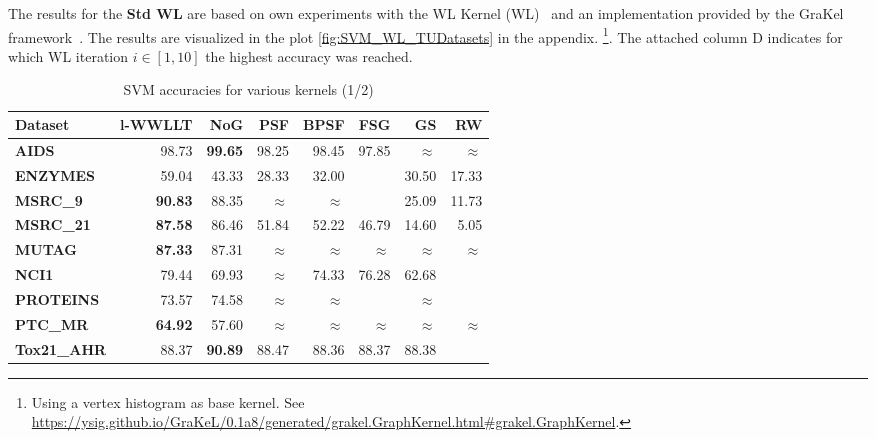     	The results for the \textbf{Std WL} are based on own experiments with the WL Kernel (WL)~\cite{2011_Shervashidze_JMLR} and an implementation provided by the GraKel framework~\cite{2020_Siglidis_CONF}.
    	The results are visualized in the plot \ref{fig:SVM_WL_TUDatasets} in the appendix.
    	\footnote{Using a vertex histogram as base kernel. See \url{https://ysig.github.io/GraKeL/0.1a8/generated/grakel.GraphKernel.html\#grakel.GraphKernel}.}.
    	The attached column D indicates for which WL iteration $i\in[1,10]$ the highest accuracy was reached.
    	    	
    	\begin{table}[h]
    		\centering
    		\begin{tabular}{|l||r|r|r|r|r|r|r|}
    			\hline
    			\textbf{Dataset} 	& \textbf{l-WWLLT} 	& \textbf{NoG} 		& \textbf{PSF} 			& \textbf{BPSF} & \textbf{FSG} & \textbf{GS} & \textbf{RW} \\ \hline\hline
    			\textbf{AIDS} 	 	& 98.73 		 	& \textbf{99.65} 	& 98.25 	& 98.45 	& 97.85 	& $\approx$	& $\approx$	\\ \hline
    			\textbf{ENZYMES} 	& 59.04 		 	& 43.33 			& 28.33 	& 32.00		& ~ 		& 30.50 	& 17.33 	\\ \hline
    			\textbf{MSRC\_9} 	& \textbf{90.83} 	& 88.35 			& $\approx$ & $\approx$ & ~ 		& 25.09 	& 11.73  	\\ \hline
    			\textbf{MSRC\_21}	& \textbf{87.58} 	& 86.46 			& 51.84 	& 52.22 	& 46.79 	& 14.60 	&  5.05  	\\ \hline    			
    			\textbf{MUTAG} 		& \textbf{87.33}	& 87.31 			& $\approx$ & $\approx$ & $\approx$ & $\approx$ & $\approx$ \\ \hline
    			\textbf{NCI1} 		& 79.44 			& 69.93 			& $\approx$ & 74.33 	& 76.28 	& 62.68 	& ~ 		\\ \hline
    			\textbf{PROTEINS} 	& 73.57 			& 74.58 			& $\approx$ & $\approx$ & ~ 		& $\approx$ & ~ 		\\ \hline
    			\textbf{PTC\_MR} 	& \textbf{64.92} 	& 57.60 			& $\approx$ & $\approx$	& $\approx$ & $\approx$ & $\approx$ \\ \hline
    			\textbf{Tox21\_AHR} & 88.37 			& \textbf{90.89} 	& 88.47 	& 88.36 	& 88.37 	& 88.38 	& ~ 		\\ \hline
    		\end{tabular}
	    	\caption{SVM accuracies for various kernels (1/2)}\label{tab:SVM_Compared1}
    	\end{table}    	
